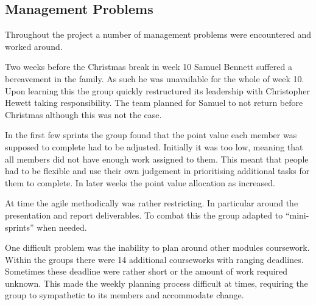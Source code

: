 \subsection{Management Problems}

Throughout the project a number of management problems were encountered and worked around.

Two weeks before the Christmas break in week 10 Samuel Bennett suffered a bereavement in the family. As such he was unavailable for the whole of week 10. Upon learning this the group quickly restructured its leadership with Christopher Hewett taking responsibility. The team planned for Samuel to not return before Christmas although this was not the case.

In the first few sprints the group found that the point value each member was supposed to complete had to be adjusted. Initially it was too low, meaning that all members did not have enough work assigned to them. This meant that people had to be flexible and use their own judgement in prioritising additional tasks for them to complete. In later weeks the point value allocation as increased.

At time the agile methodically was rather restricting. In particular around the presentation and report deliverables. To combat this the group adapted to ``mini-sprints'' when needed.

One difficult problem was the inability to plan around other modules coursework. Within the groups there were 14 additional courseworks with ranging deadlines. Sometimes these deadline were rather short or the amount of work required unknown. This made the weekly planning process difficult at times, requiring the group to sympathetic to its members and accommodate change. 